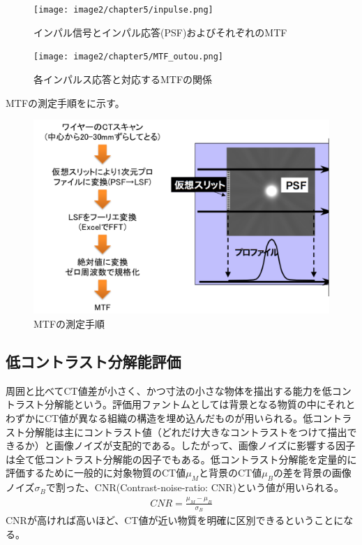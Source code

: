 \begin{figure}[H]
 \begin{center}
 \texttt{[image: image2/chapter5/inpulse.png]} 
 \end{center}
 \caption{インパル信号とインパル応答(PSF)およびそれぞれのMTF}
 \label{fig:inpulse}
\end{figure}

\begin{figure}[H]
 \begin{center}
 \texttt{[image: image2/chapter5/MTF\_outou.png]} 
 \end{center}
 \caption{各インパルス応答と対応するMTFの関係}
 \label{fig:MTF_outou}
\end{figure}

MTFの測定手順をに示す。

\begin{figure}[H]
 \begin{center}
 \includegraphics[bb=0.000000 0.000000 621.548619 408.446235,width=1\hsize]{image2/chapter5/MTF_method.png} 
 \end{center}
 \caption{MTFの測定手順\cite{ichikawa_web}\cite{ichikawa_book}}
 \label{fig:MTF_method}
\end{figure}
\fi

\subsection{低コントラスト分解能評価}
周囲と比べてCT値差が小さく、かつ寸法の小さな物体を描出する能力を低コントラスト分解能という。評価用ファントムとしては背景となる物質の中にそれとわずかにCT値が異なる組織の構造を埋め込んだものが用いられる。低コントラスト分解能は主にコントラスト値（どれだけ大きなコントラストをつけて描出できるか）と画像ノイズが支配的である。したがって、画像ノイズに影響する因子は全て低コントラスト分解能の因子でもある。低コントラスト分解能を定量的に評価するために一般的に対象物質のCT値$\mu_M$と背景のCT値$\mu_B$の差を背景の画像ノイズ$\sigma_B$で割った、CNR(Contrast-noise-ratio: CNR)という値が用いられる。
\begin{align}
CNR = \frac{\mu_M-\mu_B}{\sigma_B}
\end{align}
CNRが高ければ高いほど、CT値が近い物質を明確に区別できるということになる。

